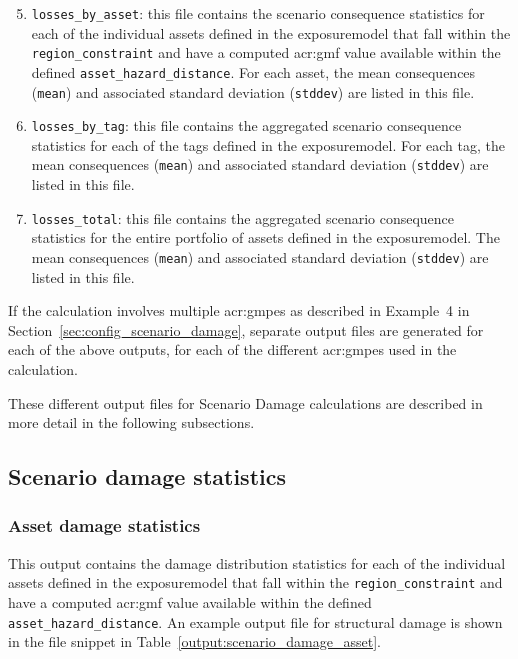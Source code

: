 \begin{enumerate}
\setcounter{enumi}{4}

  \item \Verb+losses_by_asset+: this file contains the scenario consequence
    statistics for each of the individual \glspl{asset} defined in the
    \gls{exposuremodel} that fall within the \Verb+region_constraint+ and have
    a computed \gls{acr:gmf} value available within the defined
    \Verb+asset_hazard_distance+. For each \gls{asset}, the mean consequences
    (\Verb+mean+) and associated standard deviation (\Verb+stddev+) are listed
    in this file.

  \item \Verb+losses_by_tag+: this file contains the aggregated scenario
    consequence statistics for each of the \glspl{tag} defined in the
    \gls{exposuremodel}. For each \gls{tag}, the mean consequences
    (\Verb+mean+) and associated standard deviation (\Verb+stddev+) are listed
    in this file.

  \item \Verb+losses_total+: this file contains the aggregated scenario
    consequence statistics for the entire portfolio of \glspl{asset} defined
    in the \gls{exposuremodel}. The mean consequences (\Verb+mean+) and 
    associated standard deviation (\Verb+stddev+) are listed in this file.

\end{enumerate}

If the calculation involves multiple \glspl{acr:gmpe} as described in
Example~4 in Section~\ref{sec:config_scenario_damage}, separate output files
are generated for each of the above outputs, for each of the different
\glspl{acr:gmpe} used in the calculation.

These different output files for Scenario Damage calculations are described in
more detail in the following subsections.


\subsection{Scenario damage statistics}
\label{subsec:scenario_damage_statistics}

\subsubsection{Asset damage statistics}
\label{subsubsec:scenario_asset_damage_statistics}

This output contains the damage distribution statistics for each of the
individual \glspl{asset} defined in the \gls{exposuremodel} that fall within
the \Verb+region_constraint+ and have a computed \gls{acr:gmf} value available
within the defined \Verb+asset_hazard_distance+. An example output file for
structural damage is shown in the file snippet in 
Table~\ref{output:scenario_damage_asset}.

